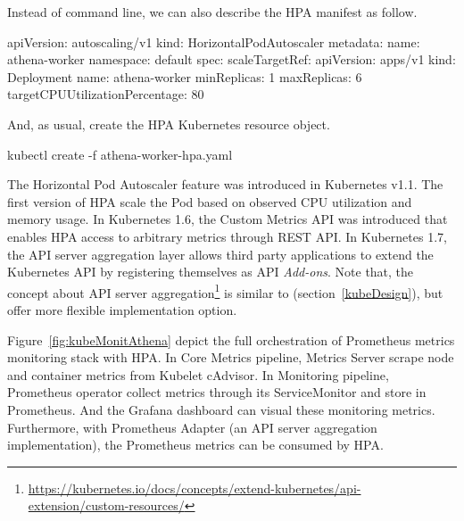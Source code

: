 \noindent Instead of command line, we can also describe the HPA manifest as follow.
\begin{small}
\begin{lcverbatim}
apiVersion: autoscaling/v1
kind: HorizontalPodAutoscaler
metadata:
  name: athena-worker
  namespace: default
spec:
  scaleTargetRef:
    apiVersion: apps/v1
    kind: Deployment
    name: athena-worker
  minReplicas: 1
  maxReplicas: 6
  targetCPUUtilizationPercentage: 80
\end{lcverbatim}
\end{small}

\noindent And, as usual, create the HPA Kubernetes resource object.
\begin{small}
\begin{lcverbatim}
kubectl create -f athena-worker-hpa.yaml
\end{lcverbatim}
\end{small}

The Horizontal Pod Autoscaler feature was introduced in Kubernetes v1.1. The first version of HPA scale the Pod based on observed CPU utilization and memory usage. In Kubernetes 1.6, the Custom Metrics API was introduced that enables HPA access to arbitrary metrics through REST API. In Kubernetes 1.7, the API server aggregation layer allows third party applications to extend the Kubernetes API by registering themselves as API \emph{Add-ons}. Note that, the concept about API server aggregation\footnote{\url{https://kubernetes.io/docs/concepts/extend-kubernetes/api-extension/custom-resources/}} is similar to  (section~\ref{kubeDesign}), but offer more flexible implementation option. 

Figure~\ref{fig:kubeMonitAthena} depict the full orchestration of Prometheus metrics monitoring stack with HPA. In Core Metrics pipeline, Metrics Server scrape node and container metrics from Kubelet cAdvisor. In Monitoring pipeline, Prometheus operator collect metrics through its ServiceMonitor and store in Prometheus. And the Grafana dashboard can visual these monitoring metrics. Furthermore, with Prometheus Adapter (an API server aggregation implementation), the Prometheus metrics can be consumed by HPA.

